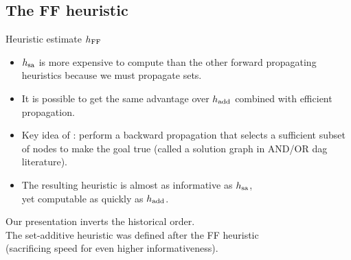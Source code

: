 \documentclass{gkibeamer}
\begin{document}
\subsection[\hff]{The FF heuristic \hff}

\begin{frame}{Heuristic estimate $h_{\text{FF}}$}
  \begin{itemize}
  \item $h_{\text{sa}}$ is more expensive to compute than the other forward
    propagating heuristics because we must propagate \alert{sets}.
  \item It is possible to get the same advantage over $h_{\text{add}}$
    combined with efficient propagation.
  \item Key idea of \alert{\hff}: perform a \alert{backward
    propagation} that selects a sufficient subset of nodes to make the
    goal true (called a \alert{solution graph} in AND/OR dag
    literature).
  \item The resulting heuristic is almost as informative as $h_{\text{sa}}$, \\
    yet computable as quickly as $h_{\text{add}}$.
  \end{itemize}

   Our presentation inverts the historical order. \\
  The set-additive heuristic was defined \alert{after} the FF
  heuristic \\
  (sacrificing speed for even higher informativeness).
\end{frame}
\end{document}
